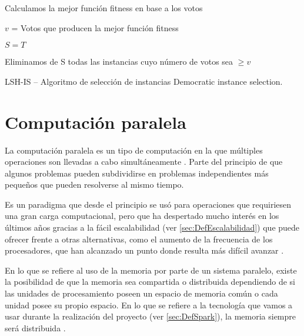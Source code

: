 \begin{algorithm*}
\DontPrintSemicolon
{}

Calculamos la mejor función fitness en base a los votos

$v$ = Votos que producen la mejor función fitness

$S = T$

Eliminamos de S todas las instancias cuyo número de votos sea $\geq v$

\caption{LSH-IS -- Algoritmo de selección de instancias Democratic instance selection. \cite{DemoISPaper}}
\label{alg:DemoIS}
\end{algorithm*}


\section{Computación paralela}\label{sec:CompParalela}

La computación paralela es un tipo de computación en la que múltiples operaciones son llevadas a cabo simultáneamente \cite{Almasi:1989}. Parte del principio de que algunos problemas pueden subdividirse en problemas independientes más pequeños que pueden resolverse al mismo tiempo.

Es un paradigma que desde el principio se usó para operaciones que requiriesen una gran carga computacional, pero que ha despertado mucho interés en los últimos años gracias a la fácil escalabilidad (ver \ref{sec:DefEscalabilidad}) que puede ofrecer frente a otras alternativas, como el aumento de la frecuencia de los procesadores, que han alcanzado un punto donde resulta más difícil avanzar \cite{CompParalelaWiki}.

En lo que se refiere al uso de la memoria por parte de un sistema paralelo, existe la posibilidad de que la memoria sea compartida o distribuida dependiendo de si las unidades de procesamiento poseen un espacio de memoria común o cada unidad posee su propio espacio. En lo que se refiere a la tecnología que vamos a usar durante la realización del proyecto (ver \ref{sec:DefSpark}), la memoria siempre será distribuida \cite{SparkPaper}.

